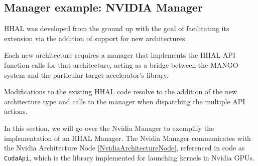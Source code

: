 \subsection{Manager example: NVIDIA Manager}

HHAL was developed from the ground up with the goal of facilitating its extension via the addition of support for new architectures.

Each new architecture requires a manager that implements the HHAL API function calls for that architecture, acting as a bridge between the MANGO system and the particular target accelerator's library.

Modifications to the existing HHAL code resolve to the addition of the new architecture type and calls to the manager when dispatching the multiple API actions.

In this section, we will go over the Nvidia Manager to exemplify the implementation of an HHAL Manager. The Nvidia Manager communicates with the Nvidia Architecture Node \ref{NvidiaArchitectureNode}, referenced in code as \texttt{CudaApi}, which is the library implemented for launching kernels in Nvidia GPUs.

